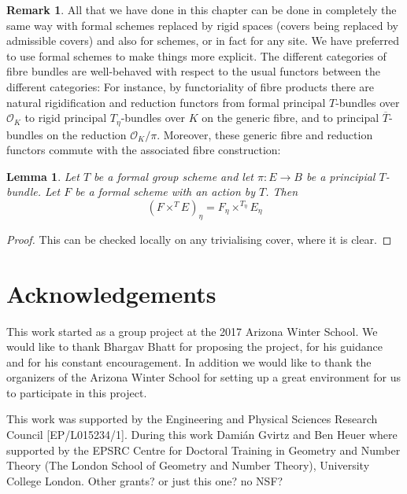 \documentclass[10pt,oneside]{amsart}
\newtheorem{lemma}[theorem]{Lemma}
\theoremstyle{definition}
\newtheorem{remark}[theorem]{Remark}
\begin{document}
	\begin{remark}\label{appendix in the case of rigid spaces and schemes}
	All that we have done in this chapter can be done in completely the same way with formal schemes replaced by rigid spaces (covers being replaced by admissible covers) and also for schemes, or in fact for any site. We have preferred to use formal schemes to make things more explicit. 
	The different categories of fibre bundles are well-behaved with respect to the usual functors between the different categories: For instance, by functoriality of fibre products there are natural rigidification and reduction functors from formal principal $T$-bundles over $\mathcal O_K$ to rigid principal $T_\eta$-bundles over $K$ on the generic fibre, and to principal $\overline{T}$-bundles on the reduction $\mathcal O_K/\pi$. Moreover, these generic fibre and reduction functors commute with the associated fibre construction:
	\end{remark}
	\begin{lemma}\label{associated bundle commutes with generic fibre}
		Let $T$ be a formal group scheme and let $\pi:E\rightarrow B$ be a principial $T$-bundle. Let $F$ be a formal scheme with an action by $T$. Then
		\[(F\times^T E)_\eta = F_\eta\times^{T_\eta} E_\eta \]
	\end{lemma}
	\begin{proof}
		This can be checked locally on any trivialising cover, where it is clear.
	\end{proof}
 


\section*{Acknowledgements}
This work started as a group project at the 2017 Arizona Winter School. We would like to thank Bhargav Bhatt for proposing the project, for his guidance and for his constant encouragement. In addition we would like to thank the organizers of the Arizona Winter School for setting up a great environment for us to participate in this project. 

This work was supported by the Engineering and Physical Sciences Research Council [EP/L015234/1]. 
During this work Dami\'an Gvirtz and Ben Heuer where supported by the EPSRC Centre for Doctoral Training in Geometry and Number Theory (The London School of Geometry and Number Theory), University College London. {\color{red} Other grants? or just this one? no NSF? }
 
\end{document}
